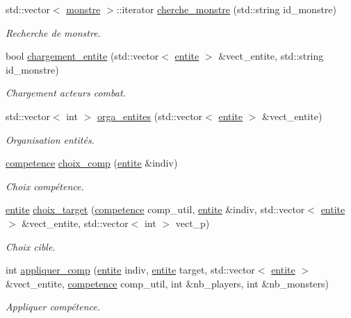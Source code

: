 \begin{DoxyCompactItemize}
std\+::vector$<$ \hyperlink{classmonstre}{monstre} $>$\+::iterator \hyperlink{classjeu_af3a81d9b899b204b4b304821c5bee43b}{cherche\+\_\+monstre} (std\+::string id\+\_\+monstre)
\begin{DoxyCompactList}\small\item\em Recherche de monstre. \end{DoxyCompactList}\item 
bool \hyperlink{classjeu_a77728b27a5a1f4194ac77c414b983f01}{chargement\+\_\+entite} (std\+::vector$<$ \hyperlink{classentite}{entite} $>$ \&vect\+\_\+entite, std\+::string id\+\_\+monstre)
\begin{DoxyCompactList}\small\item\em Chargement acteurs combat. \end{DoxyCompactList}\item 
std\+::vector$<$ int $>$ \hyperlink{classjeu_afd7a155c8adcee663d6aeb98b2dae010}{orga\+\_\+entites} (std\+::vector$<$ \hyperlink{classentite}{entite} $>$ \&vect\+\_\+entite)
\begin{DoxyCompactList}\small\item\em Organisation entités. \end{DoxyCompactList}\item 
\hyperlink{classcompetence}{competence} \hyperlink{classjeu_a91981b755a6b0895703d9adf537f0ae6}{choix\+\_\+comp} (\hyperlink{classentite}{entite} \&indiv)
\begin{DoxyCompactList}\small\item\em Choix compétence. \end{DoxyCompactList}\item 
\hyperlink{classentite}{entite} \hyperlink{classjeu_ad9ea0cb9e74e6d9b0385720528450f61}{choix\+\_\+target} (\hyperlink{classcompetence}{competence} comp\+\_\+util, \hyperlink{classentite}{entite} \&indiv, std\+::vector$<$ \hyperlink{classentite}{entite} $>$ \&vect\+\_\+entite, std\+::vector$<$ int $>$ vect\+\_\+p)
\begin{DoxyCompactList}\small\item\em Choix cible. \end{DoxyCompactList}\item 
int \hyperlink{classjeu_a6bc1f7cfd93bdc33fc9f841ec3f5f80f}{appliquer\+\_\+comp} (\hyperlink{classentite}{entite} indiv, \hyperlink{classentite}{entite} target, std\+::vector$<$ \hyperlink{classentite}{entite} $>$ \&vect\+\_\+entite, \hyperlink{classcompetence}{competence} comp\+\_\+util, int \&nb\+\_\+players, int \&nb\+\_\+monsters)
\begin{DoxyCompactList}\small\item\em Appliquer compétence. \end{DoxyCompactList}\item 

\end{DoxyCompactItemize}
